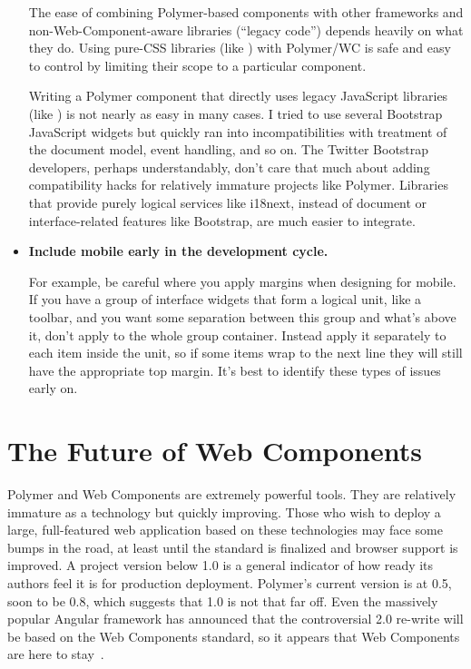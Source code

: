 \begin{itemize}
The ease of combining Polymer-based components with other frameworks and non-Web-Component-aware libraries (``legacy code'') depends heavily on what they do.
Using pure-CSS libraries (like ) with Polymer/WC is safe and easy to control by limiting their scope to a particular component. 

Writing a Polymer component that directly uses legacy JavaScript libraries (like ) is not nearly as easy in many cases. 
I tried to use several Bootstrap JavaScript widgets but quickly ran into incompatibilities with treatment of the document model, event handling, and so on.
The Twitter Bootstrap developers, perhaps understandably, don't care that much about adding compatibility hacks for relatively immature projects like Polymer. 
Libraries that provide purely logical services like i18next, instead of document or interface-related features like Bootstrap, are much easier to integrate.

\item \textbf{Include mobile early in the development cycle.}

For example, be careful where you apply margins when designing for mobile. 
If you have a group of interface widgets that form a logical unit, like a toolbar,
and you want some separation between this group and what's above it, don't apply  to the whole group container.  
Instead apply it separately to each item inside the unit, 
so if some items wrap to the next line they will still have the appropriate top margin.
It's best to identify these types of issues early on.
\end{itemize}
\endgroup

\section{The Future of Web Components}
Polymer and Web Components are extremely powerful tools.
They are relatively immature as a technology but quickly improving.
Those who wish to deploy a large, full-featured web application based on these technologies may face some bumps in the road, 
at least until the standard is finalized and browser support is improved.
A project version below 1.0 is a general indicator of how ready its authors feel it is for production deployment.
Polymer's current version is at 0.5, soon to be 0.8, 
which suggests that 1.0 is not that far off.
Even the massively popular Angular framework has announced that the controversial 2.0 re-write will be based on the Web Components standard,
so it appears that Web Components are here to stay~\cite{santiagoesteva2015}.

